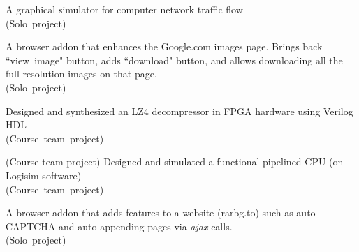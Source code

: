 




A graphical simulator for computer network traffic flow\\
\small{(Solo~project)}\\

\divider

A browser addon that enhances the Google.com images page. Brings back ``view~image" button, adds ``download" button, and allows downloading all the full-resolution images on that page.\\
\small{(Solo~project)}\\

\divider


Designed and synthesized an LZ4 decompressor in FPGA hardware using Verilog HDL\\
\small{(Course~team~project)}\\

\divider

(Course team project) Designed and simulated a functional pipelined CPU (on Logisim software)\\
\small{(Course~team~project)}\\

\divider

A browser addon that adds features to a website (rarbg.to) such as auto-CAPTCHA and auto-appending pages via \textit{ajax} calls.\\
\small{(Solo~project)}
\\

\cvproject{}